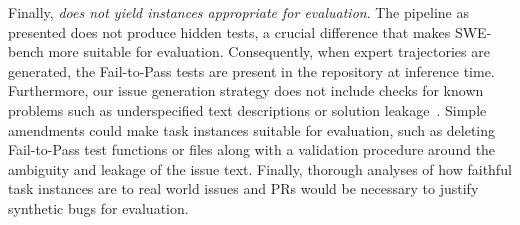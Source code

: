 Finally, \textit{\bugs{} does not yield instances appropriate for evaluation}.
The \bugs{} pipeline as presented does not produce hidden tests, a crucial difference that makes SWE-bench more suitable for evaluation.
Consequently, when expert trajectories are generated, the Fail-to-Pass tests are present in the repository at inference time.
Furthermore, our issue generation strategy does not include checks for known problems such as underspecified text descriptions or solution leakage~\citep{chowdhuryintroducing}. 
Simple amendments could make \bugs{} task instances suitable for evaluation, such as deleting Fail-to-Pass test functions or files along with a validation procedure around the ambiguity and leakage of the issue text.
Finally, thorough analyses of how faithful \bugs{} task instances are to real world issues and PRs would be necessary to justify synthetic bugs for evaluation.
